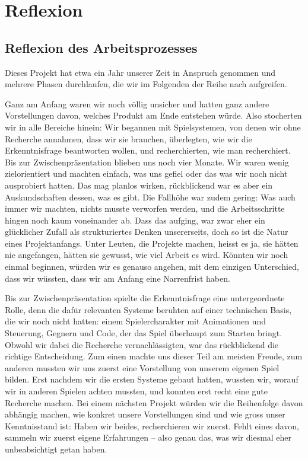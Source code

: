 \documentclass[../Main.tex]{subfiles}
\begin{document}
\section{Reflexion} \label{sec:Reflexion}

\subsection{Reflexion des Arbeitsprozesses}

Dieses Projekt hat etwa ein Jahr unserer Zeit in Anspruch genommen und mehrere Phasen durchlaufen, die wir im Folgenden der Reihe nach aufgreifen.

Ganz am Anfang waren wir noch völlig unsicher und hatten ganz andere Vorstellungen davon, welches Produkt am Ende entstehen würde. Also stocherten wir in alle Bereiche hinein: Wir begannen mit Spielsystemen, von denen wir ohne Recherche annahmen, dass wir sie brauchen, überlegten, wie wir die Erkenntnisfrage beantworten wollen, und recherchierten, wie man recherchiert. Bis zur Zwischenpräsentation blieben uns noch vier Monate. Wir waren wenig zielorientiert und machten einfach, was uns gefiel oder das was wir noch nicht ausprobiert hatten. Das mag planlos wirken, rückblickend war es aber ein Auskundschaften dessen, was es gibt. Die Fallhöhe war zudem gering: Was auch immer wir machten, nichts musste verworfen werden, und die Arbeitsschritte hingen noch kaum voneinander ab. Dass das aufging, war zwar eher ein glücklicher Zufall als strukturiertes Denken unsererseits, doch so ist die Natur eines Projektanfangs. Unter Leuten, die Projekte machen, heisst es ja, sie hätten nie angefangen, hätten sie gewusst, wie viel Arbeit es wird. Könnten wir noch einmal beginnen, würden wir es genauso angehen, mit dem einzigen Unterschied, dass wir wüssten, dass wir am Anfang eine Narrenfrist haben.

Bis zur Zwischenpräsentation spielte die Erkenntnisfrage eine untergeordnete Rolle, denn die dafür relevanten Systeme beruhten auf einer technischen Basis, die wir noch nicht hatten: einem Spielercharakter mit Animationen und Steuerung, Gegnern und Code, der das Spiel überhaupt zum Starten bringt. Obwohl wir dabei die Recherche vernachlässigten, war das rückblickend die richtige Entscheidung. Zum einen machte uns dieser Teil am meisten Freude, zum anderen mussten wir uns zuerst eine Vorstellung von unserem eigenen Spiel bilden. Erst nachdem wir die ersten Systeme gebaut hatten, wussten wir, worauf wir in anderen Spielen achten mussten, und konnten erst recht eine gute Recherche machen. Bei einem nächsten Projekt würden wir die Reihenfolge davon abhängig machen, wie konkret unsere Vorstellungen sind und wie gross unser Kenntnisstand ist: Haben wir beides, recherchieren wir zuerst. Fehlt eines davon, sammeln wir zuerst eigene Erfahrungen -- also genau das, was wir diesmal eher unbeabsichtigt getan haben.
\end{document}
